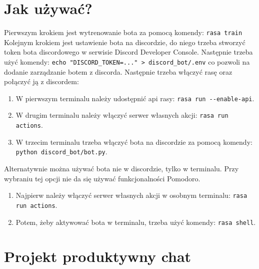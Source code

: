 \documentclass{article}
\begin{document}
\section{Jak używać?}
Pierwszym krokiem jest wytrenowanie bota za pomocą komendy:
\verb|rasa train|
Kolejnym krokiem jest ustawienie bota na discordzie, do niego trzeba stworzyć
token bota discordowego w serwisie Discord Developer Console. Następnie trzeba
użyć komendy:
\verb|echo "DISCORD_TOKEN=..." > discord_bot/.env|
co pozwoli na dodanie zarządzanie botem z discorda.
Następnie trzeba włączyć rasę oraz połączyć ją z discordem:
\begin{enumerate}
    \item[\textcolor{violet}{\textbullet}] W pierwszym terminalu należy udostępnić api rasy: 
        \verb|rasa run --enable-api|.
    \item[\textcolor{violet}{\textbullet}] W drugim terminalu należy włączyć serwer własnych akcji:
        \verb|rasa run actions|.
    \item[\textcolor{violet}{\textbullet}] W trzecim terminalu trzeba włączyć bota na discordzie za pomocą
        komendy: \verb|python discord_bot/bot.py|.
\end{enumerate}
Alternatywnie można używać bota nie w discordzie, tylko w terminalu. Przy
wybraniu tej opcji nie da się używać funkcjonalności Pomodoro.
\begin{enumerate}
    \item[\textcolor{violet}{\textbullet}] Najpierw należy włączyć serwer własnych akcji w osobnym terminalu:
        \verb|rasa run actions|.
    \item[\textcolor{violet}{\textbullet}] Potem, żeby aktywować bota w terminalu, trzeba użyć komendy: 
        \verb|rasa shell|.
\end{enumerate}
\section{Projekt produktywny chat}
\end{document}
